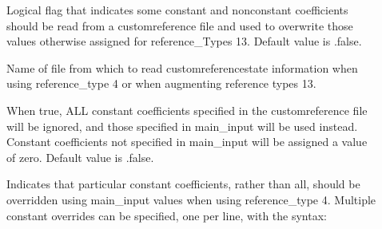 \documentclass[letterpaper,11pt,english]{sphinxmanual}
\begin{document}
\begin{description}
\item[{}] \leavevmode
\sphinxAtStartPar
Logical flag that indicates some constant and non\sphinxhyphen{}constant coefficients should be read from a custom\sphinxhyphen{}reference file and used to overwrite those values otherwise assigned for reference\_Types 1\textendash{}3.  Default value is .false.

\item[{}] \leavevmode
\sphinxAtStartPar
Name of file from which to read custom\sphinxhyphen{}reference\sphinxhyphen{}state information when using reference\_type 4 or when augmenting reference types 1\textendash{}3.

\item[{}] \leavevmode
\sphinxAtStartPar
When true, ALL constant coefficients specified in the custom\sphinxhyphen{}reference file will be ignored, and those specified in main\_input will be used instead.  Constant coefficients not specified in main\_input will be assigned a value of zero.  Default value is .false.

\item[{}] \leavevmode
\sphinxAtStartPar
Indicates that particular constant coefficients, rather than all, should be overridden using main\_input values when using reference\_type 4.  Multiple constant overrides can be specified, one per line, with the syntax:

\begin{sphinxVerbatim}[commandchars=\\\{\}]
    
   
\end{sphinxVerbatim}

\end{description}
\end{document}
